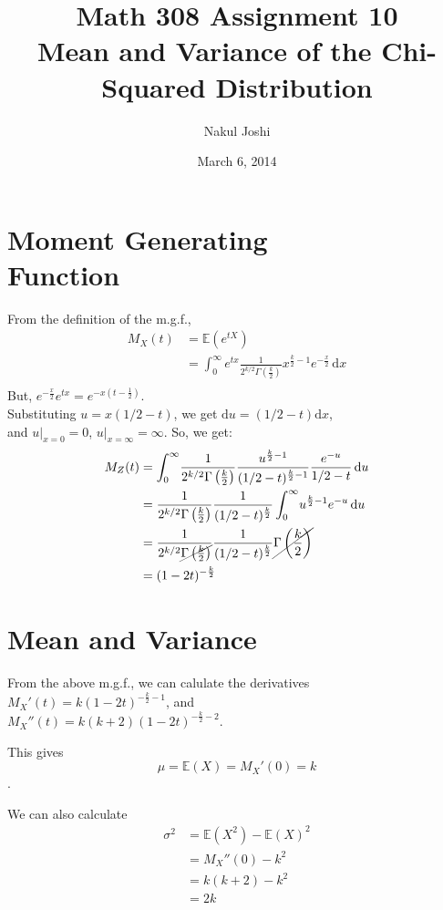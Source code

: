 \documentclass[twocolumn]{article}
\title{Math 308 Assignment 10\\Mean and Variance of the Chi-Squared Distribution}
\author{Nakul Joshi}
\date{March 6, 2014}
\newcommand{\ev}[1]{\mathbb{E}(#1)}
\newcommand{\rmd}{\mathrm{d}}
\newcommand{\intg}[4]{\int_{#1}^{#2} \! #3 \, \rmd#4}
\newcommand{\hk}{\frac{k}{2}}
\newcommand{\ga}{\Gamma\left(\hk\right)}
\begin{document}
\maketitle

\section{Moment Generating \\ Function}
From the definition of the m.g.f., \begin{align*}
M_X(t)&=\ev{e^{tX}}\\
&=\intg{0}{\infty}{
	e^{tx} \frac{1}{2^{k/2}\ga} x^{\hk-1} e^{-\frac{x}{2}}
}{x}\\
\end{align*}
But, $e^{-\frac{x}{2}}e^{tx}= e^{-x(t-\frac{1}{2})}$.\\
Substituting $u=x(1/2-t)$, we get $\rmd u= (1/2-t)\rmd x$,\\
and $u|_{x=0}=0$, $u|_{x=\infty}=\infty$.
So, we get:\begin{align*}
M_Z(t)
&=\intg{0}{\infty}{
	\frac{1}{2^{k/2} \ga} \frac{u^{\hk-1}}{(1/2-t)^{\hk-1}} \frac{e^{-u}}{1/2-t}
}{u}\\
&=\frac{1}{2^{k/2} \ga} \frac{1}{(1/2-t)^{\hk}} \intg{0}{\infty}{
	u^{\hk-1} e^{-u}
}{u}\\
&= \frac{1}{2^{k/2} \cancel{\ga}} \frac{1}{(1/2-t)^{\hk}} \cancel{\ga} \\
&= (1-2t)^{-\hk}
\end{align*}

\newpage

\section{Mean and Variance}

From the above m.g.f., we can calulate the derivatives\\
$M_X'(t)=k(1-2t)^{-\hk-1}$, and\\ $M_X''(t)=k(k+2)(1-2t)^{-\hk-2}$.

This gives \[\mu= \ev{X}= M_X'(0)=k\].

We can also calculate\begin{align*}
\sigma^2&=\ev{X^2}-{\ev{X}}^2\\
&=M_X''(0)-k^2\\
&=k(k+2)-k^2\\
&=2k
\end{align*}
\end{document}
